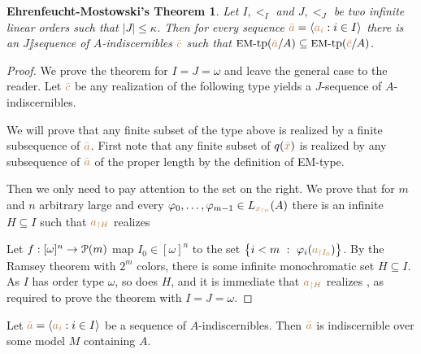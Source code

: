\documentclass[creche.tex]{subfiles}
\begin{document}
\theoremstyle{mio}
\newtheorem{EhrenfeuchtMostowski}[thm]{Ehrenfeucht-Mostowski's Theorem}
\begin{EhrenfeuchtMostowski}\label{thm_EM}
  Let $I,<_I$ and $J,<_J$ be two infinite linear orders such that $|J|\le \kappa$.
Then for every sequence ${\mr\bar a}=\<{\mr a_i}:i\in I\>$ there is an $J\jj$sequence of $A$-indiscernibles ${\mr\bar c}$ such that $\EMtp({\mr\bar a}/A)\subseteq\EMtp({\mr\bar c}/A)$.
\end{EhrenfeuchtMostowski}


\begin{proof}
  We prove the theorem for $I=J=\omega$ and leave the general case to the reader.
  Let ${\mr\bar c}$ be any realization of the following type yields a $J$-sequence of $A$-indiscernibles.


  We will prove that any finite subset of the type above is realized by a finite subsequence of ${\mr\bar a}$.
First note that any finite subset of $q({\mr\bar x})$ is realized by any subsequence of ${\mr\bar a}$ of the proper length by the definition of EM-type.
  
  Then we only need to pay attention to the set on the right.
We prove that for $m$ and $n$ arbitrary large and every $\phi_0,\dots,\phi_{m-1}\in L_{\mr x_{\restriction n}}(A)$ there is an infinite $H\subseteq I$ such that ${\mr a_{\restriction H}}$ realizes


  Let $f:[\omega]^n\to\P(m)$ map $I_0\in[\omega]^n$ to the set $\big\{i<m\ :\ \phi_i({\mr a_{\restriction I_0}})\big\}$.
By the Ramsey theorem with $2^m$ colors, there is some infinite monochromatic set $H\subseteq I$.
As $I$ has order type $\omega$, so does $H$, and it is immediate that ${\mr a_{\restriction H}}$ realizes \ssf{\#}, as required to prove the theorem with $I=J=\omega$.
\end{proof}


\begin{proposition}\label{prop_indiscernibles_set_model}
  Let ${\mr\bar a}=\<{\mr a_i}:i\in I\>$ be a sequence of $A$-indiscernibles.
Then ${\mr\bar a}$ is indiscernible over some model $M$ containing $A$.
\end{proposition}
\end{document}
